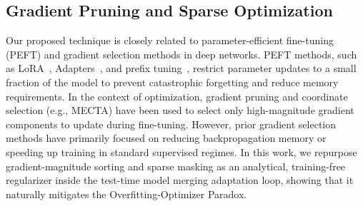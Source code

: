 \subsection{Gradient Pruning and Sparse Optimization}
Our proposed technique is closely related to parameter-efficient fine-tuning (PEFT) and gradient selection methods in deep networks. PEFT methods, such as LoRA~\cite{hu2021lora}, Adapters~\cite{houlsby2019parameter}, and prefix tuning~\cite{li2021prefix}, restrict parameter updates to a small fraction of the model to prevent catastrophic forgetting and reduce memory requirements. In the context of optimization, gradient pruning and coordinate selection (e.g., MECTA) have been used to select only high-magnitude gradient components to update during fine-tuning. However, prior gradient selection methods have primarily focused on reducing backpropagation memory or speeding up training in standard supervised regimes. In this work, we repurpose gradient-magnitude sorting and sparse masking as an analytical, training-free regularizer inside the test-time model merging adaptation loop, showing that it naturally mitigates the Overfitting-Optimizer Paradox.